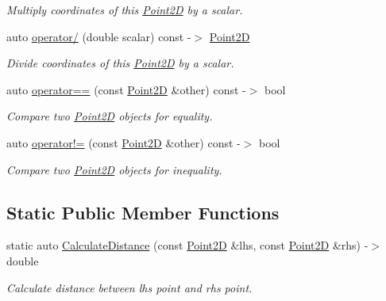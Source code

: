 \begin{DoxyCompactItemize}
\begin{DoxyCompactList}\small\item\em Multiply coordinates of this \hyperlink{classprogrammers_1_1geometry_1_1Point2D}{Point2D} by a scalar. \end{DoxyCompactList}\item 
auto \hyperlink{classprogrammers_1_1geometry_1_1Point2D_ad7cccfc72a15a6ff83cc583752d28dd4}{operator/} (double scalar) const -\/$>$ \hyperlink{classprogrammers_1_1geometry_1_1Point2D}{Point2D}
\begin{DoxyCompactList}\small\item\em Divide coordinates of this \hyperlink{classprogrammers_1_1geometry_1_1Point2D}{Point2D} by a scalar. \end{DoxyCompactList}\item 
auto \hyperlink{classprogrammers_1_1geometry_1_1Point2D_a901c0de565aba1fd759ea5d3badcf318}{operator==} (const \hyperlink{classprogrammers_1_1geometry_1_1Point2D}{Point2D} \&other) const -\/$>$ bool
\begin{DoxyCompactList}\small\item\em Compare two \hyperlink{classprogrammers_1_1geometry_1_1Point2D}{Point2D} objects for equality. \end{DoxyCompactList}\item 
auto \hyperlink{classprogrammers_1_1geometry_1_1Point2D_a14191b6d9b9b360390a36363c7d3569e}{operator!=} (const \hyperlink{classprogrammers_1_1geometry_1_1Point2D}{Point2D} \&other) const -\/$>$ bool
\begin{DoxyCompactList}\small\item\em Compare two \hyperlink{classprogrammers_1_1geometry_1_1Point2D}{Point2D} objects for inequality. \end{DoxyCompactList}\end{DoxyCompactItemize}
\subsection*{Static Public Member Functions}
\begin{DoxyCompactItemize}
\item 
static auto \hyperlink{classprogrammers_1_1geometry_1_1Point2D_a0aa082791c9cfceb5e58779c9fa1ecdf}{Calculate\+Distance} (const \hyperlink{classprogrammers_1_1geometry_1_1Point2D}{Point2D} \&lhs, const \hyperlink{classprogrammers_1_1geometry_1_1Point2D}{Point2D} \&rhs) -\/$>$ double
\begin{DoxyCompactList}\small\item\em Calculate distance between lhs point and rhs point. \end{DoxyCompactList}\end{DoxyCompactItemize}


